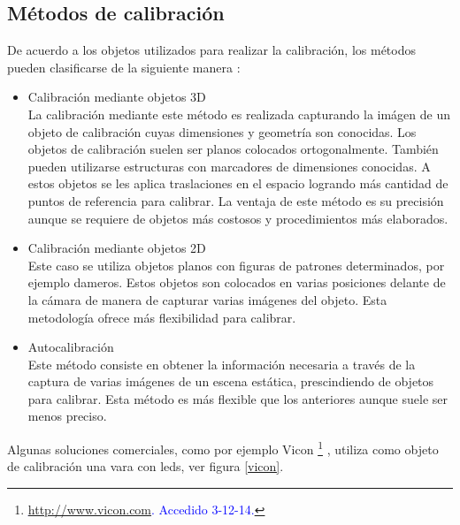 \subsection{Métodos de calibración}

De acuerdo a los objetos utilizados para realizar la calibración, los métodos pueden clasificarse de la siguiente manera \cite{zhang_libro}:\\

\begin{itemize}
\item Calibración mediante objetos 3D\\

La calibración mediante este método es realizada capturando la imágen de un objeto de calibración cuyas dimensiones y geometría son conocidas. Los objetos de calibración suelen ser planos colocados ortogonalmente. También pueden utilizarse estructuras con marcadores de dimensiones conocidas. A estos objetos se les aplica traslaciones en el espacio logrando más cantidad de puntos de referencia para calibrar. La ventaja de este método es su precisión aunque se requiere de objetos más costosos y procedimientos más elaborados.\\

\item Calibración mediante objetos 2D\\

Este caso se utiliza objetos planos con figuras de patrones determinados, por ejemplo dameros. Estos objetos son colocados en varias posiciones delante de la cámara de manera de capturar varias imágenes del objeto. Esta metodología ofrece más flexibilidad para calibrar.\\

\item Autocalibración\\

Este método consiste en obtener la información necesaria a través de la captura de varias imágenes de un escena estática, prescindiendo de objetos para calibrar. Esta método es más flexible que  los anteriores aunque suele ser menos preciso.\\

\end{itemize}


Algunas soluciones comerciales, como por ejemplo Vicon \footnote{\textcolor{blue}{\underline{\url{http://www.vicon.com}}. Accedido 3-12-14.}} , utiliza como objeto de calibración una vara con leds, ver figura \ref{vicon}. 

